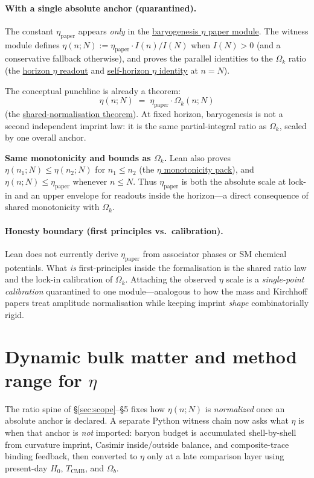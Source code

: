 \documentclass[11pt]{amsart}
\newcommand{\LeanEng}[2]{\hyperref[#1]{#2}}
\begin{document}
\paragraph{With a single absolute anchor (quarantined).}
The constant $\eta_{\mathrm{paper}}$ appears \emph{only} in the
\LeanEng{lean:eta-paper}{baryogenesis $\eta$ paper module}. The witness
module defines $\eta(n;N):=\eta_{\mathrm{paper}}\cdot I(n)/I(N)$ when
$I(N)>0$ (and a conservative fallback otherwise), and proves the parallel
identities to the $\Omega_k$ ratio (the
\LeanEng{lean:eta-at-horizon}{horizon $\eta$ readout} and
\LeanEng{lean:eta-self}{self-horizon $\eta$ identity} at $n=N$).

The conceptual punchline is already a theorem:
\[
\eta(n;N) \;=\; \eta_{\mathrm{paper}}\cdot \Omega_k(n;N)
\]
(the \LeanEng{lean:eta-omega-same}{shared-normalisation theorem}). At
fixed horizon, baryogenesis is not a second independent imprint law: it is
the same partial-integral ratio as $\Omega_k$, scaled by one overall anchor.

\medskip
\noindent\textbf{Same monotonicity and bounds as $\Omega_k$.}
Lean also proves $\eta(n_1;N)\le \eta(n_2;N)$ for $n_1\le n_2$ (the
\LeanEng{lean:eta-mono}{$\eta$ monotonicity pack}), and
$\eta(n;N)\le \eta_{\mathrm{paper}}$ whenever $n\le N$. Thus
$\eta_{\mathrm{paper}}$ is both the absolute scale at lock-in and an
upper envelope for readouts inside the horizon---a direct consequence of
shared monotonicity with $\Omega_k$.

\paragraph{Honesty boundary (first principles vs.\ calibration).}
Lean does not currently derive $\eta_{\mathrm{paper}}$ from associator
phases or SM chemical potentials. What \emph{is} first-principles inside
the formalisation is the shared ratio law and the lock-in calibration of
$\Omega_k$. Attaching the observed $\eta$ scale is a \emph{single-point
calibration} quarantined to one module---analogous to how the mass and
Kirchhoff papers treat amplitude normalisation while keeping imprint
\emph{shape} combinatorially rigid.

\section{Dynamic bulk matter and method range for \texorpdfstring{$\eta$}{eta}}
\label{sec:dynamic-bulk}

The ratio spine of \S\ref{sec:scope}--\S5 fixes how $\eta(n;N)$ is
\emph{normalized} once an absolute anchor is declared. A separate Python
witness chain now asks what $\eta$ is when that anchor is \emph{not}
imported: baryon budget is accumulated shell-by-shell from curvature
imprint, Casimir inside/outside balance, and composite-trace binding
feedback, then converted to $\eta$ only at a late comparison layer using
present-day $H_0$, $T_{\mathrm{CMB}}$, and $\Omega_b$.
\end{document}
